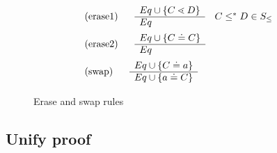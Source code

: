\documentclass[acmsmall,screen,review]{acmart}
\begin{document}
\begin{figure}
\begin{align*}
&\begin{tabular}[t]{ll}
      (erase1)  & $ 
      \begin{array}[c]{ll}
        \begin{array}[c]{l}
          Eq \cup \set{C \lessdot D}\\
          \hline
          Eq
        \end{array}
        & C \leq^* D \in S_\leq
      \end{array}$\\
          \end{tabular}\\
&\begin{tabular}[t]{ll}
      (erase2)  & $ 
      \begin{array}[c]{ll}
        \begin{array}[c]{l}
          Eq \cup \set{C \doteq C}\\
          \hline
          Eq
        \end{array}
      \end{array}$\\
          \end{tabular}\\
    &      \begin{tabular}[t]{ll}
       (swap) & $
            \begin{array}[c]{ll}
              \begin{array}[c]{l}
                Eq \cup \set{C \doteq a}\\
                \hline
                Eq \cup \set{a \doteq C}
              \end{array}
            \end{array}$
          \end{tabular}
\end{align*}
\caption{Erase and swap rules}\label{fig:fgjerase-rules}
\end{figure}

\subsection{Unify proof}
\end{document}
